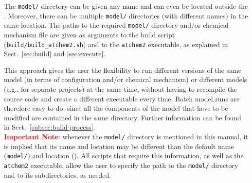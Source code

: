 The \texttt{model/} directory can be given any name and can even be
located outside the \maindir. Moreover, there can be multiple
\texttt{model/} directories (with different names) in the same
location. The paths to the required \texttt{model/} directory and/or
chemical mechanism file are given as arguments to the build script
(\texttt{build/build\_atchem2.sh}) and to the \texttt{atchem2}
executable, as explained in Sect.~\ref{sec:build} and
\ref{sec:execute}.

This approach gives the user the flexibility to run different versions
of the same model (in terms of configuration and/or chemical
mechanism) or different models (e.g., for separate projects) at the
same time, without having to recompile the source code and create a
different executable every time. Batch model runs are therefore easy
to do, since all the components of the model that have to be modified
are contained in the same directory. Further information can be found
in Sect.~\ref{subsec:build-process}.\\

\textcolor{red}{\bf Important Note}: whenever the \texttt{model/}
directory is mentioned in this manual, it is implied that its name and
location may be different than the default name (\texttt{model/}) and
location (\maindir). All scripts that require this information, as
well as the \texttt{atchem2} executable, allow the user to specify the
path to the \texttt{model/} directory and to its subdirectories, as
needed.
